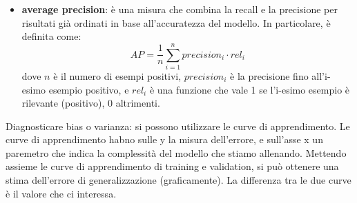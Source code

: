 \documentclass{article}
\begin{document}
\begin{itemize}
	\item \textbf{average precision}: è una misura che combina la recall e la
		precisione per risultati già ordinati in base all'accuratezza del
		modello. In particolare, è definita come:
		\begin{equation}
			AP = \frac{1}{n} \sum_{i=1}^{n} precision_i \cdot rel_i
		\end{equation}
		dove $n$ è il numero di esempi positivi, $precision_i$ è la precisione
		fino all'i-esimo esempio positivo, e $rel_i$ è una funzione che vale 1
		se l'i-esimo esempio è rilevante (positivo), 0 altrimenti.
\end{itemize}

Diagnosticare bias o varianza: si possono utilizzare le curve di apprendimento.
Le curve di apprendimento habno sulle y la misura dell'errore, e sull'asse x un
paremetro che indica la complessità del modello che stiamo allenando.
Mettendo assieme le curve di apprendimento di training e validation, si può
ottenere una stima dell'errore di generalizzazione (graficamente). La differenza
tra le due curve è il valore che ci interessa.
\end{document}

